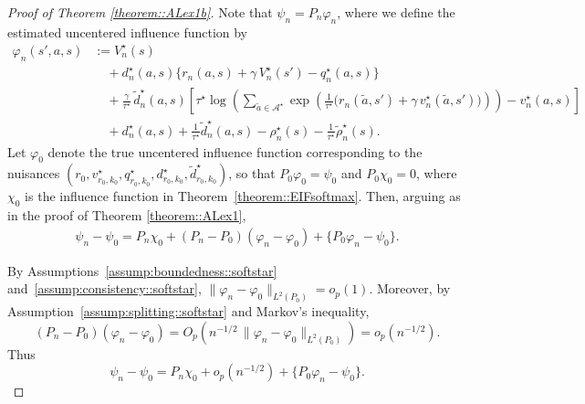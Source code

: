 \documentclass[11pt]{article}
\theoremstyle{plain}
\begin{document}
\begin{proof}[Proof of Theorem \ref{theorem::ALex1b}]
Note that $\psi_n = P_n \varphi_n$, where we define the estimated uncentered influence function by
\begin{align*}
\varphi_n(s',a,s)
&:= V_n^\star(s) \\
&\quad + d_n^\star(a,s)
        \bigl\{r_n(a,s) + \gamma\,V_n^\star(s') - q_n^\star(a,s)\bigr\} \\
&\quad + \frac{\gamma}{\tau^\star}\,
        \widetilde d_n^\star(a,s)
        \left[
           \tau^\star \log\!\left( 
                \sum_{\tilde a \in \mathcal{A}^\star} 
                \exp\!\left( 
                    \tfrac{1}{\tau^\star}\bigl( r_n(\tilde a,s') + \gamma\,v_n^\star(\tilde a,s') \bigr) 
                \right)
            \right)
            - v_n^\star(a,s)
        \right] \\
&\quad +d_n^\star(a,s)+\frac{1}{\tau^\star}\widetilde d_n^\star(a,s)
      -\rho_n^\star(s)-\frac{1}{\tau^\star}\widetilde\rho_n^\star(s).
\end{align*}
Let $\varphi_0$ denote the true uncentered influence function corresponding to the nuisances 
$(r_0, v_{r_0,k_0}^\star, q_{r_0,k_0}^\star, d_{r_0,k_0}^\star, \widetilde d_{r_0,k_0}^\star)$, so that $P_0 \varphi_0 = \psi_0$ and $P_0\chi_0 = 0$, where $\chi_0$ is the influence function in Theorem~\ref{theorem::EIFsoftmax}. Then, arguing as in the proof of Theorem \ref{theorem::ALex1},
\begin{align*}
    \psi_n - \psi_0 = P_n \chi_0 + (P_n - P_0)(\varphi_n - \varphi_0) + \{P_0 \varphi_n - \psi_0\}.
\end{align*}

By Assumptions~\ref{assump:boundedness::softstar} and~\ref{assump:consistency::softstar}, 
$\|\varphi_n - \varphi_0\|_{L^2(P_0)} = o_p(1)$. Moreover, by
Assumption~\ref{assump:splitting::softstar} and Markov’s inequality,
\[
(P_n - P_0)(\varphi_n - \varphi_0)
= O_p\!\left(n^{-1/2}\,\|\varphi_n - \varphi_0\|_{L^2(P_0)}\right)
= o_p(n^{-1/2}).
\]
Thus
\[
\psi_n - \psi_0
= P_n \chi_0 + o_p(n^{-1/2}) + \{P_0 \varphi_n - \psi_0\}.
\]


\end{proof}
\end{document}
